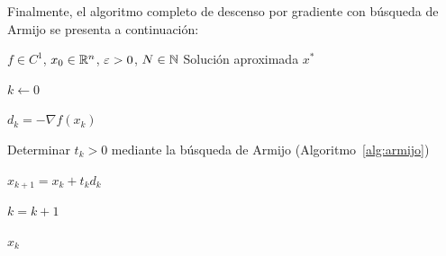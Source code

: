 Finalmente, el algoritmo completo de descenso por gradiente con búsqueda de Armijo se presenta a continuación:

\begin{algorithm}
    \caption{Descenso por Gradiente con Búsqueda de Armijo}
    \label{alg:descenso_armijo}
    \begin{algorithmic}[1]
        \Require \( f \in C^1 \), \( x_0 \in \mathbb{R}^n \), \( \varepsilon > 0 \), \( N \in \mathbb{N} \)
        \Ensure Solución aproximada \( x^* \)

        \State \( k \gets 0 \)


        \State \( d_k = -\nabla f(x_k) \)

        \State Determinar \( t_k > 0 \) mediante la búsqueda de Armijo (Algoritmo~\ref{alg:armijo})

        \State \( x_{k+1} = x_k + t_k d_k \)

        \State \( k = k + 1 \)
        \EndWhile

        \State \Return \( x_k \)
    \end{algorithmic}
\end{algorithm}
